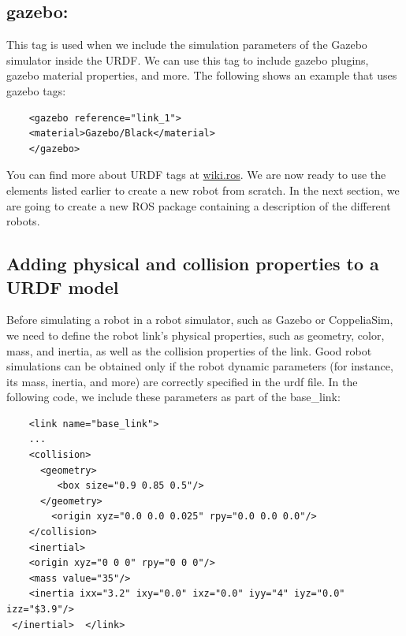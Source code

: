 \documentclass[../../main]{subfiles}
\begin{document}
\subsection{gazebo:}
This tag is used when we include the simulation parameters of the
Gazebo simulator inside the URDF. We can use this tag to include gazebo plugins,
gazebo material properties, and more. The following shows an example that uses
gazebo tags:
\\

\begin{verbatim}
    <gazebo reference="link_1">
    <material>Gazebo/Black</material>
    </gazebo>
\end{verbatim}
You can find more about URDF tags at \href{http://wiki.ros.org/urdf/XML}{wiki.ros}\cite{ros_urdf_xml}. We are now
ready to use the elements listed earlier to create a new robot from scratch. In the next
section, we are going to create a new ROS package containing a description of the different
robots.

\subsection{Adding physical and collision properties to a URDF model}
Before simulating a robot in a robot simulator, such as Gazebo or CoppeliaSim, we need
to define the robot link's physical properties, such as geometry, color, mass, and inertia, as
well as the collision properties of the link.
Good robot simulations can be obtained only if the robot dynamic parameters (for
instance, its mass, inertia, and more) are correctly specified in the urdf file. In the
following code, we include these parameters as part of the base\_link:

\begin{verbatim}
    <link name="base_link">
    ...
    <collision>
      <geometry>
         <box size="0.9 0.85 0.5"/>
      </geometry>
        <origin xyz="0.0 0.0 0.025" rpy="0.0 0.0 0.0"/>
    </collision>
    <inertial>
    <origin xyz="0 0 0" rpy="0 0 0"/>
    <mass value="35"/>
    <inertia ixx="3.2" ixy="0.0" ixz="0.0" iyy="4" iyz="0.0" izz="$3.9"/>
 </inertial>  </link>
\end{verbatim}
\end{document}
